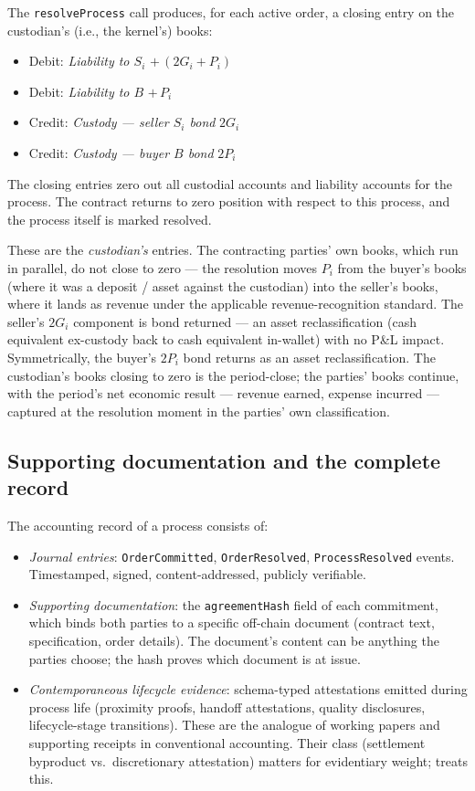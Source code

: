 \documentclass[11pt,a4paper]{article}
\theoremstyle{definition}
\theoremstyle{remark}
\begin{document}
The \texttt{resolveProcess} call produces, for each active
order, a closing entry on the custodian's (i.e., the kernel's)
books:
\begin{itemize}
  \item Debit: \emph{Liability to $S_i$} \quad $+\, (2G_i + P_i)$
  \item Debit: \emph{Liability to $B$} \quad $+\, P_i$
  \item Credit: \emph{Custody --- seller $S_i$ bond} \quad $2G_i$
  \item Credit: \emph{Custody --- buyer $B$ bond} \quad $2P_i$
\end{itemize}

The closing entries zero out all custodial accounts and
liability accounts for the process. The contract returns to
zero position with respect to this process, and the process
itself is marked resolved.

These are the \emph{custodian's} entries. The contracting
parties' own books, which run in parallel, do not close to
zero --- the resolution moves $P_i$ from the buyer's books
(where it was a deposit / asset against the custodian) into
the seller's books, where it lands as revenue under the
applicable revenue-recognition standard. The seller's
$2G_i$ component is bond returned --- an asset
reclassification (cash equivalent ex-custody back to cash
equivalent in-wallet) with no P\&L impact. Symmetrically,
the buyer's $2P_i$ bond returns as an asset reclassification.
The custodian's books closing to zero is the period-close;
the parties' books continue, with the period's net economic
result --- revenue earned, expense incurred --- captured at
the resolution moment in the parties' own classification.

\subsection{Supporting documentation and the complete record}

The accounting record of a process consists of:

\begin{itemize}
  \item \emph{Journal entries}: \texttt{OrderCommitted},
    \texttt{OrderResolved}, \texttt{ProcessResolved}
    events. Timestamped, signed, content-addressed, publicly
    verifiable.
  \item \emph{Supporting documentation}: the
    \texttt{agreementHash} field of each commitment, which
    binds both parties to a specific off-chain document
    (contract text, specification, order details). The
    document's content can be anything the parties choose;
    the hash proves which document is at issue.
  \item \emph{Contemporaneous lifecycle evidence}:
    schema-typed attestations emitted during process life
    (proximity proofs, handoff attestations, quality
    disclosures, lifecycle-stage transitions). These are the
    analogue of working papers and supporting receipts in
    conventional accounting. Their class (settlement byproduct
    vs.\ discretionary attestation) matters for evidentiary
    weight;  treats this.
\end{itemize}
\end{document}
